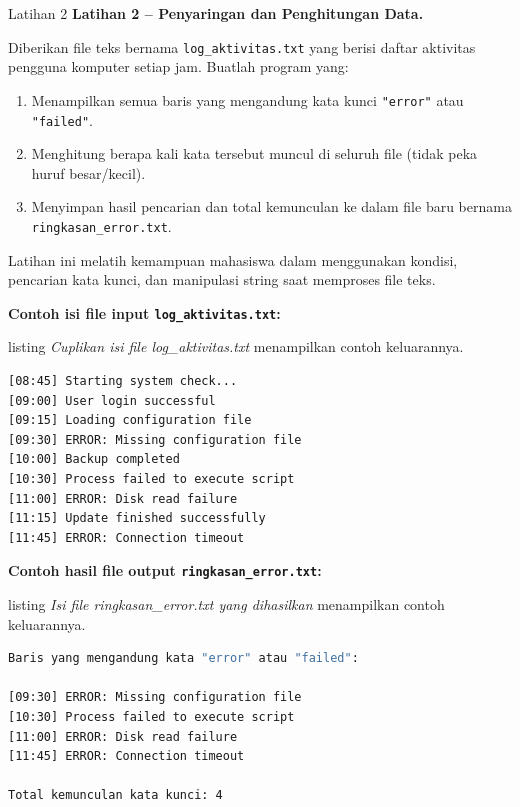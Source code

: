 \documentclass[aspectratio=169, table]{beamer}
\begin{document}
\begin{frame}[fragile,allowframebreaks=0.8]{Latihan 2}
\footnotesize
\textbf{Latihan 2 – Penyaringan dan Penghitungan Data.}\par\medskip
Diberikan file teks bernama \texttt{log\_aktivitas.txt} yang berisi daftar aktivitas pengguna komputer setiap jam.  
Buatlah program yang:
\begin{enumerate}
    \item Menampilkan semua baris yang mengandung kata kunci \texttt{"error"} atau \texttt{"failed"}.  
    \item Menghitung berapa kali kata tersebut muncul di seluruh file (tidak peka huruf besar/kecil).  
    \item Menyimpan hasil pencarian dan total kemunculan ke dalam file baru bernama \texttt{ringkasan\_error.txt}.  
\end{enumerate}

Latihan ini melatih kemampuan mahasiswa dalam menggunakan kondisi, pencarian kata kunci, dan manipulasi string saat memproses file teks.

\noindent\textbf{Contoh isi file input \texttt{log\_aktivitas.txt}:}

listing \textit{Cuplikan isi file log_aktivitas.txt} menampilkan contoh keluarannya.

\begin{lstlisting}[language=bash, breaklines=true, basicstyle=\ttfamily\scriptsize]
[08:45] Starting system check...
[09:00] User login successful
[09:15] Loading configuration file
[09:30] ERROR: Missing configuration file
[10:00] Backup completed
[10:30] Process failed to execute script
[11:00] ERROR: Disk read failure
[11:15] Update finished successfully
[11:45] ERROR: Connection timeout
\end{lstlisting}

\noindent\textbf{Contoh hasil file output \texttt{ringkasan\_error.txt}:}

listing \textit{Isi file ringkasan_error.txt yang dihasilkan} menampilkan contoh keluarannya.

\begin{lstlisting}[language=bash, breaklines=true, basicstyle=\ttfamily\scriptsize]
Baris yang mengandung kata "error" atau "failed":

[09:30] ERROR: Missing configuration file
[10:30] Process failed to execute script
[11:00] ERROR: Disk read failure
[11:45] ERROR: Connection timeout

Total kemunculan kata kunci: 4
\end{lstlisting}
\end{frame}
\end{document}
